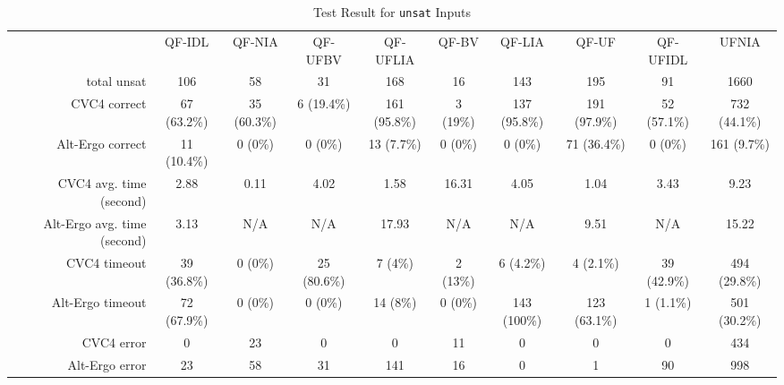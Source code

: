 \documentclass[10pt,twocolumn,letter]{article}
\theoremstyle{definition}
\begin{document}
\begin{sidewaystable}[!b]
\small
\begin{tabular}{rccccccccc}

& QF-IDL & QF-NIA & QF-UFBV & QF-UFLIA & QF-BV & QF-LIA & QF-UF & QF-UFIDL & UFNIA\\
total unsat & 106 & 58 & 31 & 168 & 16 & 143 & 195 & 91 & 1660\\
CVC4 correct & 67 (63.2\%) & 35 (60.3\%) & 6 (19.4\%) & 161 (95.8\%) & 3 (19\%) & 137 (95.8\%) & 191 (97.9\%) & 52 (57.1\%) & 732 (44.1\%)\\
Alt-Ergo correct & 11 (10.4\%) & 0 (0\%) & 0 (0\%) & 13 (7.7\%) & 0 (0\%) & 0 (0\%) & 71 (36.4\%) & 0 (0\%) & 161 (9.7\%)\\
CVC4 avg. time (second) & 2.88 & 0.11 & 4.02 & 1.58 & 16.31 & 4.05 & 1.04 & 3.43 & 9.23\\
Alt-Ergo avg. time (second) & 3.13 & N/A & N/A & 17.93 & N/A & N/A & 9.51 & N/A & 15.22\\
CVC4 timeout & 39 (36.8\%) & 0 (0\%) & 25 (80.6\%) & 7 (4\%) & 2 (13\%) & 6 (4.2\%) & 4 (2.1\%) & 39 (42.9\%) & 494 (29.8\%)\\
Alt-Ergo timeout & 72 (67.9\%) & 0 (0\%) & 0 (0\%) & 14 (8\%) & 0 (0\%) & 143 (100\%) & 123 (63.1\%) & 1 (1.1\%) & 501 (30.2\%)\\
CVC4 error & 0 & 23 & 0 & 0 & 11 & 0 & 0 & 0 & 434\\
Alt-Ergo error & 23 & 58 & 31 & 141 & 16 & 0 & 1 & 90 & 998
\end{tabular}
\caption{Test Result for {\tt unsat} Inputs}
\label{t:result}
\end{sidewaystable}



\end{document}
